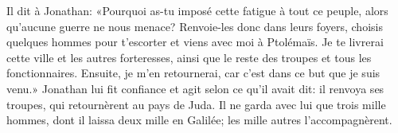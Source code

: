 Il dit à Jonathan: «Pourquoi as-tu imposé cette fatigue à tout ce peuple,
	alors qu’aucune guerre ne nous menace?
Renvoie-les donc dans leurs foyers, choisis quelques hommes pour t’escorter
	et viens avec moi à Ptolémaïs.
Je te livrerai cette ville et les autres forteresses,
	ainsi que le reste des troupes et tous les fonctionnaires.
Ensuite, je m’en retournerai, car c’est dans ce but que je suis venu.»
Jonathan lui fit confiance et agit selon ce qu’il avait dit:
	il renvoya ses troupes, qui retournèrent au pays de Juda.
Il ne garda avec lui que trois mille hommes, dont il laissa deux mille en Galilée;
	les mille autres l’accompagnèrent.
